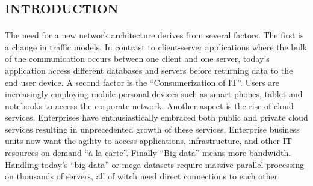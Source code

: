 %
\section*{\small \textsc{introduction}}
The need for a new network architecture derives from several factors. The first is a change in traffic models. In contrast to client-server applications where the bulk of the communication occurs between one client and one server, today's application access different databases and servers before returning data to the end user device. A second factor is the ``Consumerization of \ac{IT}''. Users are increasingly employing mobile personal devices such as smart phones, tablet and notebooks to access the corporate network. Another aspect is the rise of cloud services. Enterprises have enthusiastically embraced both public and private cloud services resulting in unprecedented growth of these services. Enterprise business units now want the agility to access applications, infrastructure, and other \ac{IT} resources on demand ``à la carte''. Finally ``Big data'' means more bandwidth. Handling today's ``big data'' or mega datasets require massive parallel processing on thousands of servers, all of witch need direct connections to each other. \cite{onf:sdn-description-need}

